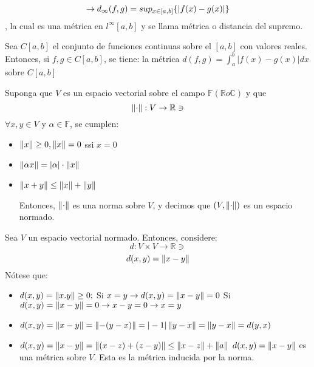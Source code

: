\begin{example}
\begin{center}
\end{center}

$$\to d_\infty(f,g)=sup_{x\in[a,b]}\{|f(x)-g(x)|\}$$, la cual es una métrica en $l^{\infty}[a,b]$ y se llama métrica o distancia del supremo.
\end{example}

\begin{example}
Sea $C[a,b]$ el conjunto de funciones continuas sobre el $[a,b]$ con valores reales. Entonces, si $f,g\in C[a,b]$, se tiene: la métrica $d(f,g)=\int_a^b |f(x)-g(x)|dx$ sobre $C[a,b]$
\end{example}

\begin{definition}[Norma]
Suponga que $V$ es un espacio vectorial sobre el campo $\mathbb{F}(\mathbb{R} o \mathbb{C})$ y que $$\left\lVert\cdot\right\rVert: V\to \mathbb{R}\ni$$
$\forall x,y\in V$ y $\alpha\in \mathbb{F}$, se cumplen:
\begin{itemize}
    \item $\left\lVert x\right\rVert\geq 0, \left\lVert x\right\rVert=0$ ssi $x=0$
    \item $\left\lVert\alpha x\right\rVert=|\alpha|\cdot \left\lVert x\right\rVert$
    \item $\left\lVert x+y\right\rVert\leq \left\lVert x\right\rVert+\left\lVert y\right\rVert$
    
    Entonces, $\left\lVert\cdot\right\rVert$ es una norma sobre $V$, y decimos que $(V,\left\lVert\cdot\right\rVert)$ es un espacio normado.
\end{itemize}
\end{definition}

\begin{remark}
Sea $V$ un espacio vectorial normado. Entonces, considere: 
$$d:V\times V\to \mathbb{R}\ni$$
$$d(x,y)=\left\lVert x-y\right\rVert$$
Nótese que: \begin{itemize}
    \item $d(x,y)=\left\lVert x.y\right\rVert\geq 0;$\newline 
    Si $x=y\to d(x,y)=\left\lVert x-y\right\rVert=0$
    \newline 
    Si $d(x,y)=\left\lVert x-y\right\rVert=0\to x-y=0\to x=y$
    \item $d(x,y)=\left\lVert x-y\right\rVert=\left\lVert-(y-x)\right\rVert=|-1|\left\lVert y-x\right\rVert= \left\lVert y-x\right\rVert=d(y,x)$
    \item $d(x,y)=\left\lVert x-y\right\rVert=\left\lVert(x-z)+(z-y)\right\rVert\leq \left\lVert x-z\right\rVert+\left\lVert a\right\rVert$
    \newline $d(x,y)=\left\lVert x-y\right\rVert$ es una métrica sobre $V$. Esta es la métrica inducida por la norma. 
\end{itemize}
\end{remark}


